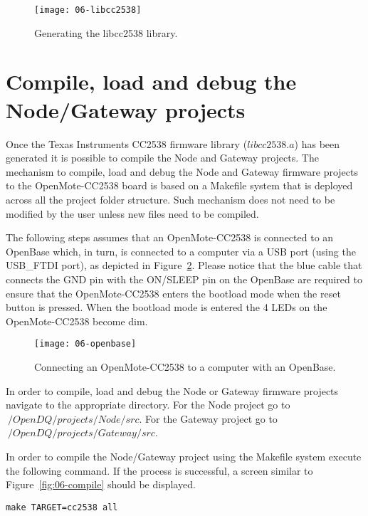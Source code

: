\begin{figure}[!t]
    \centering
	\texttt{[image: 06-libcc2538]}
    \caption{Generating the libcc2538 library.}
    \label{fig:libcc2538}
\end{figure}

\label{sec:06-firmware}
\section{Compile, load and debug the Node/Gateway projects}
Once the Texas Instruments CC2538 firmware library ($libcc2538.a$) has been generated it is possible to compile the Node and Gateway projects. The mechanism to compile, load and debug the Node and Gateway firmware projects to the OpenMote-CC2538 board is based on a Makefile system that is deployed across all the project folder structure. Such mechanism does not need to be modified by the user unless new files need to be compiled.

The following steps assumes that an OpenMote-CC2538 is connected to an OpenBase which, in turn, is connected to a computer via a USB port (using the USB\_FTDI port), as depicted in Figure~\ref{fig:06-openbase}. Please notice that the blue cable that connects the GND pin with the ON/SLEEP pin on the OpenBase are required to ensure that the OpenMote-CC2538 enters the bootload mode when the reset button is pressed. When the bootload mode is entered the 4 LEDs on the OpenMote-CC2538 become dim.

\begin{figure}[!ht]
    \centering
	\texttt{[image: 06-openbase]}
    \caption{Connecting an OpenMote-CC2538 to a computer with an OpenBase.}
    \label{fig:06-openbase}
\end{figure}

In order to compile, load and debug the Node or Gateway firmware projects navigate to the appropriate directory. For the Node project go to $~/OpenDQ/projects/Node/src$. For the Gateway project go to $~/OpenDQ/projects/Gateway/src$.

In order to compile the Node/Gateway project using the Makefile system execute the following command. If the process is successful, a screen similar to Figure~\ref{fig:06-compile} should be displayed.

\begin{verbatim}
make TARGET=cc2538 all
\end{verbatim}


